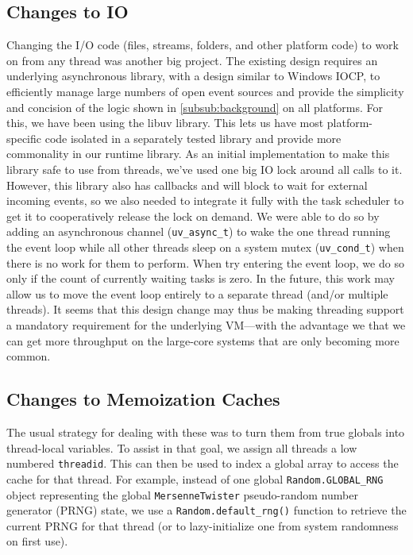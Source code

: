 \documentclass{juliacon}
\begin{document}
\subsection{Changes to IO}
\label{subsub:integration-io}

Changing the I/O code (files, streams, folders, and other platform code) to work on from any thread was another big project. The existing design requires an underlying asynchronous library, with a design similar to Windows IOCP, to efficiently manage large numbers of open event sources and provide the simplicity and concision of the logic shown in \ref{subsub:background} on all platforms. For this, we have been using the libuv library. This lets us have most platform-specific code isolated in a separately tested library and provide more commonality in our runtime library. As an initial implementation to make this library safe to use from threads, we've used one big IO lock around all calls to it. However, this library also has callbacks and will block to wait for external incoming events, so we also needed to integrate it fully with the task scheduler to get it to cooperatively release the lock on demand. We were able to do so by adding an asynchronous channel (\verb|uv_async_t|) to wake the one thread running the event loop while all other threads sleep on a system mutex (\verb|uv_cond_t|) when there is no work for them to perform. When try entering the event loop, we do so only if the count of currently waiting tasks is zero. In the future, this work may allow us to move the event loop entirely to a separate thread (and/or multiple threads). It seems that this design change may thus be making threading support a mandatory requirement for the underlying VM—with the advantage we that we can get more throughput on the large-core systems that are only becoming more common.

\subsection{Changes to Memoization Caches}
\label{subsub:integration-caches}

The usual strategy for dealing with these was to turn them from true globals into thread-local variables. To assist in that goal, we assign all threads a low numbered \verb|threadid|. This can then be used to index a global array to access the cache for that thread. For example, instead of one global \verb|Random.GLOBAL_RNG| object representing the global \verb|MersenneTwister| pseudo-random number generator (PRNG) state, we use a \verb|Random.default_rng()| function to retrieve the current PRNG for that thread (or to lazy-initialize one from system randomness on first use).
\end{document}
